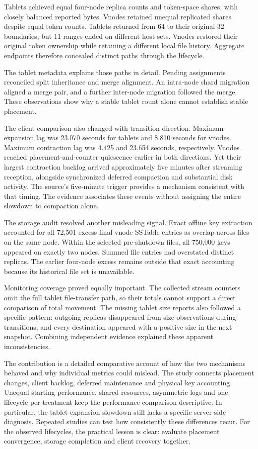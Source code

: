 Tablets achieved equal four-node replica counts and token-space shares, with closely balanced reported bytes. Vnodes retained unequal replicated shares despite equal token counts. Tablets returned from 64 to their original 32 boundaries, but 11 ranges ended on different host sets. Vnodes restored their original token ownership while retaining a different local file history. Aggregate endpoints therefore concealed distinct paths through the lifecycle.

The tablet metadata explains those paths in detail. Pending assignments reconciled split inheritance and merge alignment. An intra-node shard migration aligned a merge pair, and a further inter-node migration followed the merge. These observations show why a stable tablet count alone cannot establish stable placement.

The client comparison also changed with transition direction. Maximum expansion lag was 23.070 seconds for tablets and 8.810 seconds for vnodes. Maximum contraction lag was 4.425 and 23.654 seconds, respectively. Vnodes reached placement-and-counter quiescence earlier in both directions. Yet their largest contraction backlog arrived approximately five minutes after streaming reception, alongside synchronized deferred compaction and substantial disk activity. The source's five-minute trigger provides a mechanism consistent with that timing. The evidence associates these events without assigning the entire slowdown to compaction alone.

The storage audit resolved another misleading signal. Exact offline key extraction accounted for all 72,501 excess final vnode SSTable entries as overlap across files on the same node. Within the selected pre-shutdown files, all 750,000 keys appeared on exactly two nodes. Summed file entries had overstated distinct replicas. The earlier four-node excess remains outside that exact accounting because its historical file set is unavailable.

Monitoring coverage proved equally important. The collected stream counters omit the full tablet file-transfer path, so their totals cannot support a direct comparison of total movement. The missing tablet size reports also followed a specific pattern: outgoing replicas disappeared from size observations during transitions, and every destination appeared with a positive size in the next snapshot. Combining independent evidence explained these apparent inconsistencies.

The contribution is a detailed comparative account of how the two mechanisms behaved and why individual metrics could mislead. The study connects placement changes, client backlog, deferred maintenance and physical key accounting. Unequal starting performance, shared resources, asymmetric logs and one lifecycle per treatment keep the performance comparison descriptive. In particular, the tablet expansion slowdown still lacks a specific server-side diagnosis. Repeated studies can test how consistently these differences recur. For the observed lifecycles, the practical lesson is clear: evaluate placement convergence, storage completion and client recovery together.

